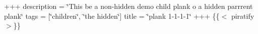 +++ description = \char`\"{}\+This be a non-\/hidden demo child plank o\textquotesingle{} a hidden parrrent plank\char`\"{} tags = \mbox{[}\char`\"{}children\char`\"{}, \char`\"{}the hidden\char`\"{}\mbox{]} title = \char`\"{}plank 1-\/1-\/1-\/1\char`\"{} +++ \{\{$<$ piratify $>$\}\} 